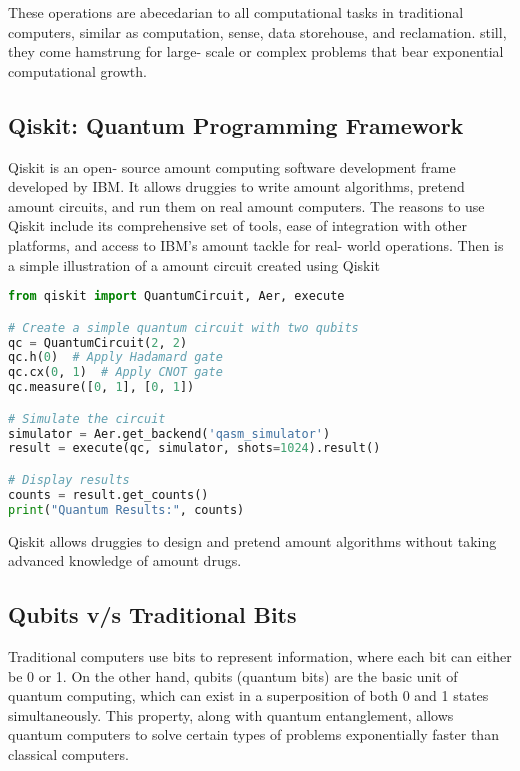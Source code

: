 \documentclass[12pt,a4paper]{article}
\begin{document}
These operations are abecedarian to all computational tasks in traditional computers, similar as computation, sense, data storehouse, and reclamation. still, they come hamstrung for large- scale or complex problems that bear exponential computational growth.




\subsection{Qiskit: Quantum Programming Framework}
Qiskit is an open- source amount computing software development  frame developed by IBM. It allows  druggies to write amount algorithms,  pretend amount circuits, and run them on real amount computers. The reasons to use Qiskit include its comprehensive set of tools, ease of integration with other platforms, and access to IBM's amount  tackle for real- world  operations. Then is a simple  illustration of a amount circuit created using Qiskit 


\begin{tcolorbox}[title=Qiskit Example]
\begin{lstlisting}[language=Python]
from qiskit import QuantumCircuit, Aer, execute

# Create a simple quantum circuit with two qubits
qc = QuantumCircuit(2, 2)
qc.h(0)  # Apply Hadamard gate
qc.cx(0, 1)  # Apply CNOT gate
qc.measure([0, 1], [0, 1])

# Simulate the circuit
simulator = Aer.get_backend('qasm_simulator')
result = execute(qc, simulator, shots=1024).result()

# Display results
counts = result.get_counts()
print("Quantum Results:", counts)
\end{lstlisting}
\end{tcolorbox}

Qiskit allows druggies to design and pretend amount algorithms without taking advanced knowledge of amount drugs.

\subsection{Qubits v/s Traditional Bits}
Traditional computers use bits to represent information, where each bit can either be 0 or 1. On the other hand, qubits (quantum bits) are the basic unit of quantum computing, which can exist in a superposition of both 0 and 1 states simultaneously. This property, along with quantum entanglement, allows quantum computers to solve certain types of problems exponentially faster than classical computers.
\end{document}
